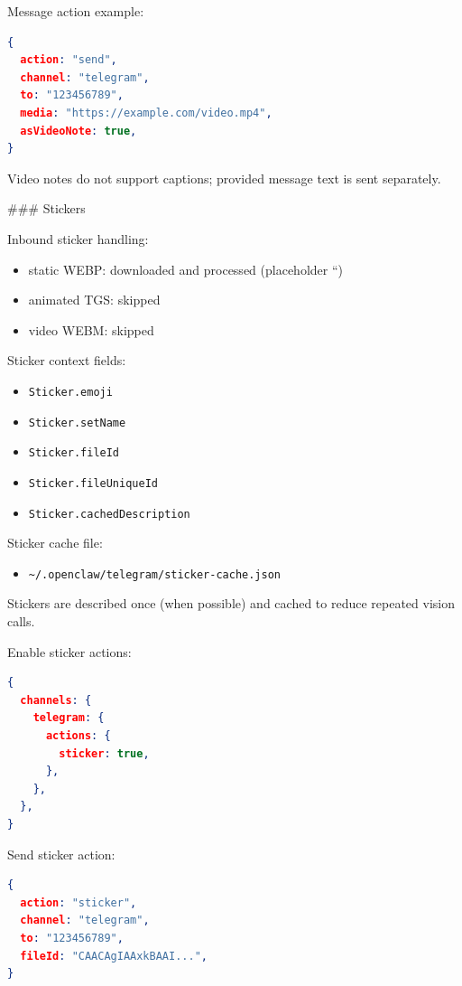 Message action example:

\begin{lstlisting}[language=json]
{
  action: "send",
  channel: "telegram",
  to: "123456789",
  media: "https://example.com/video.mp4",
  asVideoNote: true,
}
\end{lstlisting}


Video notes do not support captions; provided message text is sent separately.

\#\#\# Stickers

Inbound sticker handling:

\begin{itemize}
  \item static WEBP: downloaded and processed (placeholder ``)
  \item animated TGS: skipped
  \item video WEBM: skipped
\end{itemize}


Sticker context fields:

\begin{itemize}
  \item \texttt{Sticker.emoji}
  \item \texttt{Sticker.setName}
  \item \texttt{Sticker.fileId}
  \item \texttt{Sticker.fileUniqueId}
  \item \texttt{Sticker.cachedDescription}
\end{itemize}


Sticker cache file:

\begin{itemize}
  \item \texttt{\textasciitilde{}/.openclaw/telegram/sticker-cache.json}
\end{itemize}


Stickers are described once (when possible) and cached to reduce repeated vision calls.

Enable sticker actions:

\begin{lstlisting}[language=json]
{
  channels: {
    telegram: {
      actions: {
        sticker: true,
      },
    },
  },
}
\end{lstlisting}


Send sticker action:

\begin{lstlisting}[language=json]
{
  action: "sticker",
  channel: "telegram",
  to: "123456789",
  fileId: "CAACAgIAAxkBAAI...",
}
\end{lstlisting}


